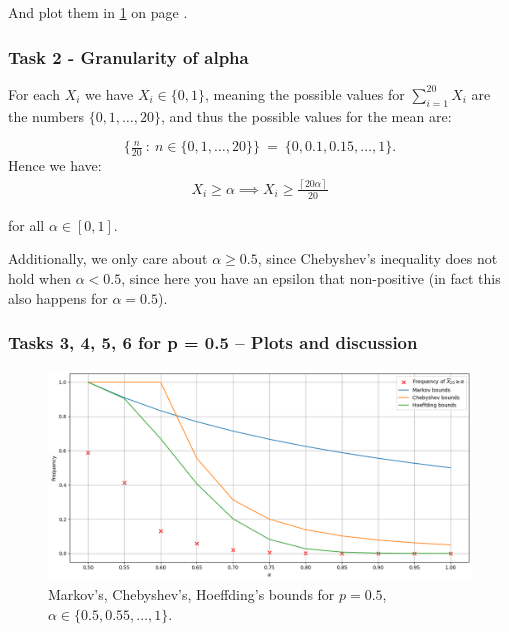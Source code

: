 \noindent And plot them in \cref{fig:task_1_a} on page \pageref{fig:task_1_a}.

\subsubsection{Task 2 - Granularity of alpha}
\label{sec:task_2}

For each $X_i$ we have $X_i \in \{0, 1\}$, meaning the possible values for
$\textstyle \sum_{i = 1}^{20} X_i$ are the numbers $\{0, 1, \dots, 20\}$, and thus
the possible values for the mean are:

$$\{\tfrac{n}{20}\ :\  n \in \{0, 1, \dots, 20\}\}\ =\ \{0, 0.1, 0.15, \dots, 1\}.$$
Hence we have:
\begin{align*}
  X_i \geq \alpha \implies X_i \geq \frac{\left\lceil20\alpha\right\rceil}{20}
\end{align*}

\noindent for all $\alpha \in [0, 1]$.

\bigskip

Additionally, we only care about $\alpha \geq 0.5$, since Chebyshev's inequality
does not hold when $\alpha < 0.5$, since here you have an epsilon that
non-positive (in fact this also happens for $\alpha = 0.5$).

\subsubsection{Tasks 3, 4, 5, 6 for p = 0.5 -- Plots and discussion}

\begin{figure}[H]
  \includegraphics[width=\textwidth]{figures/task_1_a.png}
  \caption{\footnotesize Markov's, Chebyshev's, Hoeffding's bounds for $p =
  0.5$,
  $\alpha \in \{0.5, 0.55, \dots, 1\}$.}
  \label{fig:task_1_a}
\end{figure}

